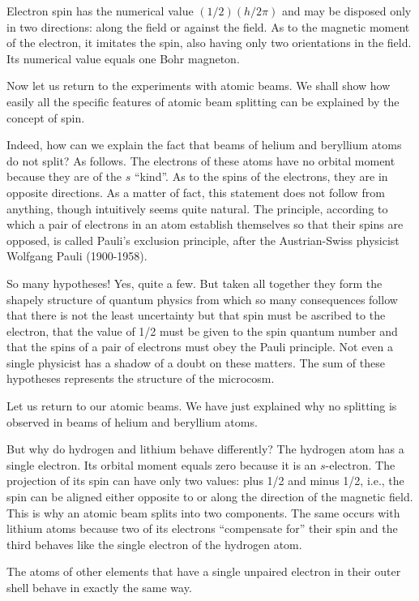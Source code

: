 Electron spin has the numerical value $(1/2) (h/2\pi)$ and may be disposed only in two directions: along the field or against the field. As to the magnetic moment of the electron, it imitates the spin, also having only two orientations in the field. Its numerical value equals one Bohr magneton.

Now let us return to the experiments with atomic beams. We shall show how easily all the specific features of atomic beam splitting can be explained by the concept of spin.

Indeed, how can we explain the fact that beams of helium and beryllium atoms do not split? As follows. The electrons of these atoms have no orbital moment because they are of the $s$ ``kind''. As to the spins of the electrons, they are in opposite directions. As a matter of fact, this statement does not follow from anything,
though intuitively seems quite natural. The principle, according to which a pair of electrons in an atom establish themselves so that their spins are opposed, is called Pauli's exclusion principle, after the Austrian-Swiss physicist Wolfgang Pauli (1900-1958).

So many hypotheses! Yes, quite a few. But taken all together they form the shapely structure of quantum physics from which so many consequences follow that there is not the least uncertainty but that spin must be ascribed to the electron, that the value of 1/2 must be given to the spin quantum number and that the spins
of a pair of electrons must obey the Pauli principle. Not even a single physicist has a shadow of a doubt on these matters. The sum of these hypotheses represents the structure of the microcosm.

Let us return to our atomic beams. We have just explained why no splitting is observed in beams of helium and beryllium atoms.

But why do hydrogen and lithium behave differently? The hydrogen atom has a single electron. Its orbital moment equals zero because it is an $s$-electron. The projection of its spin can have only two values: plus 1/2 and minus 1/2, i.e., the spin can be aligned either opposite to or along the direction of the magnetic field. This is why an atomic beam splits into two components. The same occurs with lithium atoms because two of its electrons ``compensate for'' their spin and the third behaves like the single electron of the hydrogen atom.

The atoms of other elements that have a single unpaired electron in their outer shell behave in exactly the same way.

